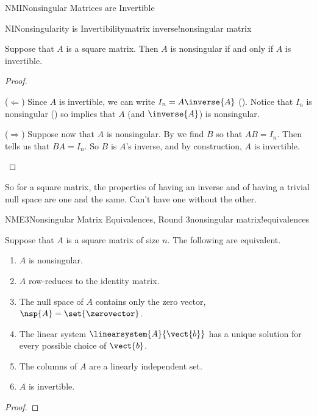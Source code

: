 \begin{subsect}{NMI}{Nonsingular Matrices are Invertible}
%
\begin{theorem}{NI}{Nonsingularity is Invertibility}{matrix inverse!nonsingular matrix}
\begin{para}Suppose that $A$ is a square matrix.  Then $A$ is nonsingular if and only if $A$ is invertible.\end{para}
\end{theorem}
%
\begin{proof}
\begin{para}($\Leftarrow$)  Since $A$ is invertible, we can write $I_n=A\inverse{A}$ ().  Notice that $I_n$ is nonsingular () so  implies that $A$ (and $\inverse{A}$) is nonsingular.\end{para}
%
\begin{para}($\Rightarrow$)  Suppose now that $A$ is nonsingular.  By  we find $B$ so that $AB=I_n$.  Then  tells us that $BA=I_n$.  So $B$ is $A$'s inverse, and by construction, $A$ is invertible.\end{para}
%
\end{proof}
%
\begin{para}So for a square matrix, the properties of having an inverse and of having a trivial null space are one and the same.  Can't have one without the other.\end{para}
%
\begin{theorem}{NME3}{Nonsingular Matrix Equivalences, Round 3}{nonsingular matrix!equivalences}
\begin{para}Suppose that $A$ is a square matrix of size $n$.  The following are equivalent.
%
\begin{enumerate}
\item $A$ is nonsingular.
\item $A$ row-reduces to the identity matrix.
\item The null space of $A$ contains only the zero vector, $\nsp{A}=\set{\zerovector}$.
\item The linear system $\linearsystem{A}{\vect{b}}$ has a unique solution for every possible choice of $\vect{b}$.
\item The columns of $A$ are a linearly independent set.
\item $A$ is invertible.
\end{enumerate}
\end{para}
\end{theorem}
%
\begin{proof}

\end{proof}
\end{subsect}
